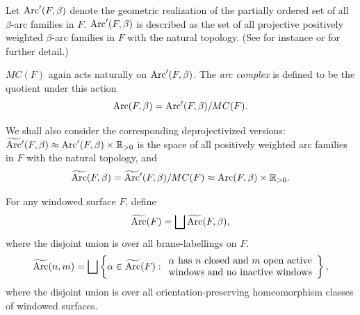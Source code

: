 Let ${\rm Arc}'(F,\beta )$ denote the geometric realization of the partially
ordered set of all $\beta$-arc families in $F$.  ${\rm Arc}'(F,\beta )$ is
described as the set of all projective positively weighted $\beta$-arc
families in $F$ with the natural topology. (See for instance \cite{KLP} or \cite{P1} for
further detail.)

$MC(F)$ again
acts naturally on ${\rm Arc}'(F,\beta )$.  The {\it arc
complex} is def\/ined to be the  quotient under this action
\[
{\rm Arc}(F,\beta )={\rm Arc}'(F,\beta )/MC(F).
\]

We shall also consider the corresponding deprojectivized versions:
$\widetilde{\rm Arc}{}'(F,\beta )\approx {\rm Arc}'(F,\beta )\times{\mathbb R}_{>0}$ is the space of all positively weighted arc
families in $F$ with the natural topology, and
\[
\widetilde{\rm Arc}(F,\beta )=\widetilde{\rm Arc}{}'(F,\beta )/MC(F)\approx
{\rm Arc}(F,\beta )\times{\mathbb R}_{>0}.
\]



For any windowed surface $F$, def\/ine
\[
\widetilde{\rm Arc}(F)=\bigsqcup \widetilde{\rm Arc}(F,\beta),
\]
where the disjoint union is over all brane-labellings on $F$.
\[
\widetilde{\rm Arc}(n,m)=\bigsqcup \left\{ \alpha\in \widetilde{\rm Arc}(F):
\begin{array}{l}\alpha ~{\rm has}~n~{\rm closed~and}~ m~{\rm
open~active}\\{\rm
windows~and~no~inactive~windows}\end{array}\right\},
\] where the
disjoint union is over all orientation-preserving
homeomorphism classes of windowed surfaces.




